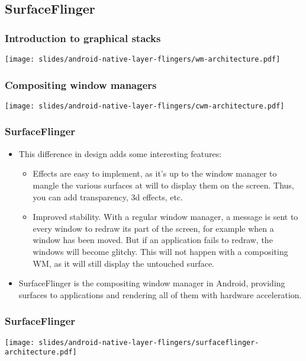 \subsection{SurfaceFlinger}
\begin{frame}
  \frametitle{Introduction to graphical stacks}
  \begin{center}
    \texttt{[image: slides/android-native-layer-flingers/wm-architecture.pdf]}
  \end{center}
\end{frame}

\begin{frame}
  \frametitle{Compositing window managers}
  \begin{center}
    \texttt{[image: slides/android-native-layer-flingers/cwm-architecture.pdf]}
  \end{center}
\end{frame}

\begin{frame}
  \frametitle{SurfaceFlinger}
  \begin{itemize}
  \item This difference in design adds some interesting features:
    \begin{itemize}
    \item Effects are easy to implement, as it's up to the window
      manager to mangle the various surfaces at will to display them
      on the screen. Thus, you can add transparency, 3d effects, etc.
    \item Improved stability. With a regular window manager, a message
      is sent to every window to redraw its part of the screen, for
      example when a window has been moved. But if an application
      fails to redraw, the windows will become glitchy. This will not
      happen with a compositing WM, as it will still display the
      untouched surface.
    \end{itemize}
  \item SurfaceFlinger is the compositing window manager in Android,
    providing surfaces to applications and rendering all of them with
    hardware acceleration.
  \end{itemize}
\end{frame}

\begin{frame}
  \frametitle{SurfaceFlinger}
  \begin{center}
    \texttt{[image: slides/android-native-layer-flingers/surfaceflinger-architecture.pdf]}
  \end{center}
\end{frame}
